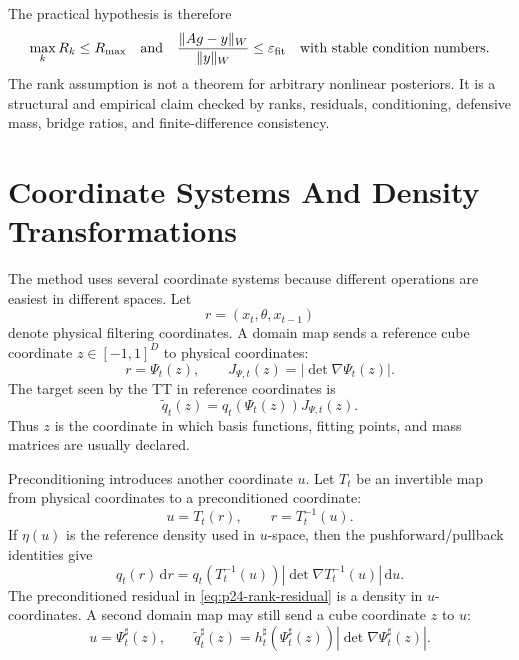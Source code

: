 \documentclass[11pt]{article}
\numberwithin{equation}{section}
\newcommand{\dd}{\,\mathrm d}
\begin{document}
The practical hypothesis is therefore
\begin{equation}
    \max_k R_k \le R_{\max}
    \quad\text{and}\quad
    \frac{\|A g-y\|_{W}}{\|y\|_{W}}\le\varepsilon_{\rm fit}
    \quad\text{with stable condition numbers}.
    \label{eq:p24-rank-diagnostic}
\end{equation}
The rank assumption is not a theorem for arbitrary nonlinear posteriors.  It
is a structural and empirical claim checked by ranks, residuals, conditioning,
defensive mass, bridge ratios, and finite-difference consistency.

\section{Coordinate Systems And Density Transformations}

The method uses several coordinate systems because different operations are
easiest in different spaces.  Let
\begin{equation}
    r=(x_t,\theta,x_{t-1})
    \label{eq:p24-coord-physical}
\end{equation}
denote physical filtering coordinates.  A domain map sends a reference cube
coordinate \(z\in[-1,1]^D\) to physical coordinates:
\begin{equation}
    r=\Psi_t(z),
    \qquad
    J_{\Psi,t}(z)=\left|\det\nabla\Psi_t(z)\right|.
    \label{eq:p24-coord-domain}
\end{equation}
The target seen by the TT in reference coordinates is
\begin{equation}
    \widetilde q_t(z)
    =
    q_t(\Psi_t(z))J_{\Psi,t}(z).
    \label{eq:p24-coord-reference-density}
\end{equation}
Thus \(z\) is the coordinate in which basis functions, fitting points, and
mass matrices are usually declared.

Preconditioning introduces another coordinate \(u\).  Let \(T_t\) be an
invertible map from physical coordinates to a preconditioned coordinate:
\begin{equation}
    u=T_t(r),
    \qquad
    r=T_t^{-1}(u).
    \label{eq:p24-coord-preconditioner}
\end{equation}
If \(\eta(u)\) is the reference density used in \(u\)-space, then the
pushforward/pullback identities give
\begin{equation}
    q_t(r)\dd r
    =
    q_t(T_t^{-1}(u))
    \left|\det\nabla T_t^{-1}(u)\right|\dd u.
    \label{eq:p24-coord-density-u}
\end{equation}
The preconditioned residual in \eqref{eq:p24-rank-residual} is a density in
\(u\)-coordinates.  A second domain map may still send a cube coordinate \(z\)
to \(u\):
\begin{equation}
    u=\Psi_t^\sharp(z),
    \qquad
    \widetilde q_t^\sharp(z)
    =
    h_t^\sharp(\Psi_t^\sharp(z))
    \left|\det\nabla\Psi_t^\sharp(z)\right|.
    \label{eq:p24-coord-preconditioned-reference}
\end{equation}
\end{document}
